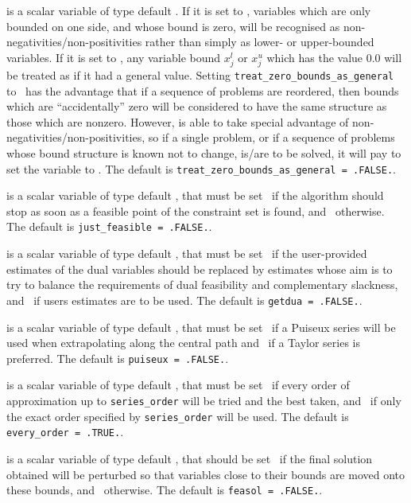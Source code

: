 \begin{description}
 is a scalar variable of type
default \logical.
If it is set to \false, variables which
are only bounded on one side, and whose bound is zero,
will be recognised as non-negativities/non-positivities rather than simply as
lower- or upper-bounded variables.
If it is set to \true, any variable bound
$x_{j}^{l}$ or $x_{j}^{u}$ which has the value 0.0 will be
treated as if it had a general value.
Setting {\tt treat\_zero\_bounds\_as\_general} to \true\ has the advantage
that if a sequence of problems are reordered, then bounds which are
``accidentally'' zero will be considered to have the same structure as
those which are nonzero. However, {\tt \fullpackagename} is
able to take special advantage of non-negativities/non-positivities, so
if a single problem, or if a sequence of problems whose
bound structure is known not to change, is/are to be solved,
it will pay to set the variable to \false.
The default is {\tt treat\_zero\_bounds\_as\_general = .FALSE.}.

 is a scalar variable of type default \logical, that
must be set \true\ if the algorithm should stop as soon as a feasible point
of the constraint set is found, and \false\ otherwise.
The default is {\tt just\_feasible = .FALSE.}.

 is a scalar variable of type default \logical, that
must be set \true\ if the user-provided estimates of the dual variables
should be replaced by estimates whose aim is to try to balance the
requirements of dual feasibility and complementary slackness,
and \false\ if users estimates are to be used.
The default is {\tt getdua = .FALSE.}.

 is a scalar variable of type default \logical, that
must be set \true\
if a Puiseux series will be used when extrapolating along the central path
and \false\ if a Taylor series is preferred.
The default is {\tt puiseux = .FALSE.}.

 is a scalar variable of type default \logical, that
must be set \true\
if every order of approximation up to {\tt series\_order} will be tried
and the best taken,
and \false\ if only the exact order specified by  {\tt series\_order}
will be used.
The default is {\tt every\_order = .TRUE.}.

 is a scalar variable of type default \logical, that
should be set \true\
if the final solution obtained will be perturbed
so that variables close to their bounds are moved onto these bounds,
and \false\ otherwise.
The default is {\tt feasol = .FALSE.}.


\end{description}
